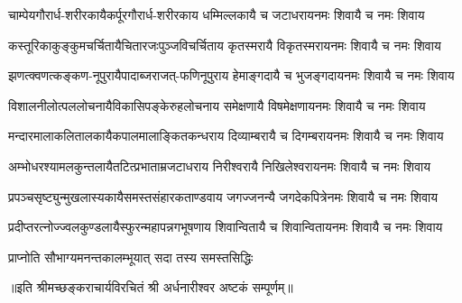 

\fourlineindentedshloka
{चाम्पेयगौरार्ध-शरीरकायै}{कर्पूरगौरार्ध-शरीरकाय}
{धम्मिल्लकायै च जटाधराय}{नमः शिवायै च नमः शिवाय}

\fourlineindentedshloka
{कस्तूरिकाकुङ्कुमचर्चितायै}{चितारजःपुञ्जविचर्चिताय}
{कृतस्मरायै विकृतस्मराय}{नमः शिवायै च नमः शिवाय}

\fourlineindentedshloka
{झणत्क्वणत्कङ्कण-नूपुरायै}{पादाब्जराजत्-फणिनूपुराय}
{हेमाङ्गदायै च भुजङ्गदाय}{नमः शिवायै च नमः शिवाय}

\fourlineindentedshloka
{विशालनीलोत्पललोचनायै}{विकासिपङ्केरुहलोचनाय}
{समेक्षणायै विषमेक्षणाय}{नमः शिवायै च नमः शिवाय}

\fourlineindentedshloka
{मन्दारमालाकलितालकायै}{कपालमालाङ्कितकन्धराय}
{दिव्याम्बरायै च दिगम्बराय}{नमः शिवायै च नमः शिवाय}

\fourlineindentedshloka
{अम्भोधरश्यामलकुन्तलायै}{तटित्प्रभाताम्रजटाधराय}
{निरीश्वरायै निखिलेश्वराय}{नमः शिवायै च नमः शिवाय}

\fourlineindentedshloka
{प्रपञ्चसृष्ट्युन्मुखलास्यकायै}{समस्तसंहारकताण्डवाय}
{जगज्जनन्यै जगदेकपित्रे}{नमः शिवायै च नमः शिवाय}

\fourlineindentedshloka
{प्रदीप्तरत्नोज्ज्वलकुण्डलायै}{स्फुरन्महापन्नगभूषणाय}
{शिवान्वितायै च शिवान्विताय}{नमः शिवायै च नमः शिवाय}

{प्राप्नोति सौभाग्यमनन्तकालम्}{भूयात् सदा तस्य समस्तसिद्धिः}

{॥इति श्रीमच्छङ्कराचार्यविरचितं श्री अर्धनारीश्वर अष्टकं सम्पूर्णम्॥}
%
%
%
